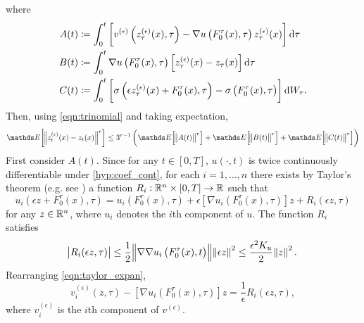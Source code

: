 where
\begin{align*}
	A(t) & \coloneqq \int_0^t{\left[v^{(\epsilon)}\left(z_\tau^{(\epsilon)}(x), \tau\right) - \nabla u\left(F_0^\tau(x), \tau\right) z_\tau^{(\epsilon)}(x)\right]\dif\tau} \\
	B(t) & \coloneqq \int_0^t{\nabla u\left(F_0^\tau(x), \tau\right)\left[z_\tau^{(\epsilon)}(x) - z_\tau(x)\right]\dif\tau}                                                \\
	C(t) & \coloneqq \int_0^t{\left[\sigma\left(\epsilon z_\tau^{(\epsilon)}(x) + F_0^{\tau}(x),\tau\right) - \sigma \left(F_0^\tau(x), \tau\right)\right] \dif W_\tau}.
\end{align*}
Then, using \eqref{eqn:trinomial} and taking expectation,
\begin{equation}
	\avg{\norm{z_t^{(\epsilon)}(x) - z_t(x)}^r} \leq 3^{r-1}\left(\avg{\norm{A(t)}^r} + \avg{\norm{B(t)}^r} + \avg{\norm{C(t)}^r}\right)
	\label{eqn:diff_decomp}
\end{equation}
First consider \(A(t)\).
Since for any \(t \in [0,T]\), \(u\left(\cdot, t\right)\) is twice continuously differentiable under \ref{hyp:coef_cont}, for each \(i = 1,\hdots,n\) there exists by Taylor's theorem (e.g. see \cite[Cor. A9.3.]{HubbardHubbard_2009_VectorCalculusLinear}) a function \(R_i: \mathbb{R}^n \times [0,T] \to \mathbb{R}\) such that
\begin{equation}
	u_i\left(\epsilon z + F_0^\tau(x), \tau\right) = u_i\left(F_0^\tau(x), \tau\right) + \epsilon\left[\nabla u_i\left(F_0^\tau(x), \tau\right)\right]z + R_i(\epsilon z, \tau)
	\label{eqn:taylor_expan}
\end{equation}
for any \(z \in \mathbb{R}^n\), where \(u_i\) denotes the \(i\)th component of \(u\).
The function \(R_i\) satisfies
\begin{equation}
	\abs{R_i(\epsilon z, \tau)} \leq \frac12\norm{\nabla\nabla u_i\left(F_0^\tau(x), t\right)}\norm{\epsilon z}^2 \leq \frac{\epsilon^2 K_u}{2}\norm{z}^2.
	\label{eqn:rem_ineq}
\end{equation}
Rearranging \eqref{eqn:taylor_expan},
\[
	v_i^{(\epsilon)}\left(z, \tau\right) - \left[\nabla u_i\left(F_0^\tau(x), \tau\right)\right] z = \frac{1}{\epsilon}R_i(\epsilon z, \tau),
\]
where \(v_i^{(\epsilon)}\) is the \(i\)th component of \(v^{(\epsilon)}\).
